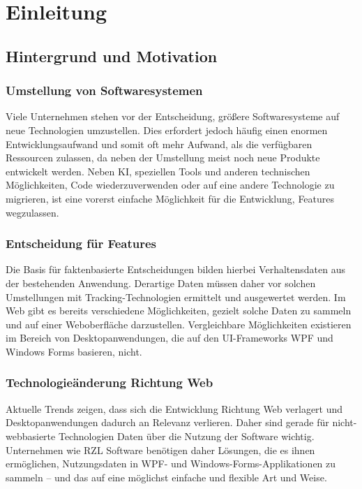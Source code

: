 \chapter{Einleitung}

\section{Hintergrund und Motivation}

\subsection{Umstellung von Softwaresystemen}
Viele Unternehmen stehen vor der Entscheidung, größere Softwaresysteme auf neue Technologien umzustellen. Dies erfordert jedoch häufig einen enormen Entwicklungsaufwand und somit oft mehr Aufwand, als die verfügbaren Ressourcen zulassen, da neben der Umstellung meist noch neue Produkte entwickelt werden. Neben KI, speziellen Tools und anderen technischen Möglichkeiten, Code wiederzuverwenden oder auf eine andere Technologie zu migrieren, ist eine vorerst einfache Möglichkeit für die Entwicklung, Features wegzulassen.

\subsection{Entscheidung für Features}
Die Basis für faktenbasierte Entscheidungen bilden hierbei Verhaltensdaten aus der bestehenden Anwendung. Derartige Daten müssen daher vor solchen Umstellungen mit Tracking-Technologien ermittelt und ausgewertet werden. Im Web gibt es bereits verschiedene Möglichkeiten, gezielt solche Daten zu sammeln und auf einer Weboberfläche darzustellen. Vergleichbare Möglichkeiten existieren im Bereich von Desktopanwendungen, die auf den UI-Frameworks WPF und Windows Forms basieren, nicht.

\subsection{Technologieänderung Richtung Web}
Aktuelle Trends zeigen, dass sich die Entwicklung Richtung Web verlagert und Desktopanwendungen dadurch an Relevanz verlieren. Daher sind gerade für nicht-webbasierte Technologien Daten über die Nutzung der Software wichtig. Unternehmen wie RZL Software benötigen daher Lösungen, die es ihnen ermöglichen, Nutzungsdaten in WPF- und Windows-Forms-Applikationen zu sammeln – und das auf eine möglichst einfache und flexible Art und Weise.

